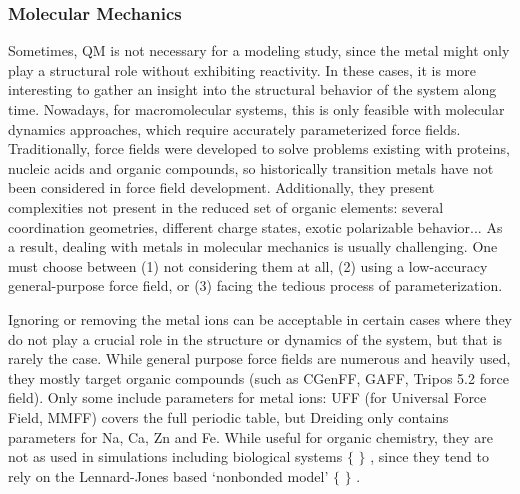 \subsubsection{Molecular Mechanics}
Sometimes, QM is not necessary for a modeling study, since the metal might only play a structural role without exhibiting reactivity. In these cases, it is more interesting to gather an insight into the structural behavior of the system along time. Nowadays, for macromolecular systems, this is only feasible with molecular dynamics approaches, which require accurately parameterized force fields. Traditionally, force fields were developed to solve problems existing with proteins, nucleic acids and organic compounds,\cite{lifson1968consistent,allinger1973,momany1975energy} so historically transition metals have not been considered in force field development. Additionally, they present complexities not present in the reduced set of organic elements: several coordination geometries, different charge states, exotic polarizable behavior... As a result, dealing with metals in molecular mechanics is usually challenging. One must choose between (1) not considering them at all, (2) using a low-accuracy general-purpose force field, or (3) facing the tedious process of parameterization.

Ignoring or removing the metal ions can be acceptable in certain cases where they do not play a crucial role in the structure or dynamics of the system, but that is rarely the case. While general purpose force fields are numerous and heavily used, they mostly target organic compounds (such as CGenFF,\cite{Vanommeslaeghe2009} GAFF,\cite{Wang2004} Tripos 5.2 force field\cite{clark1989}). Only some include parameters for metal ions: UFF (for Universal Force Field,\cite{rappe1992} MMFF\cite{halgren1996}) covers the full periodic table, but Dreiding\cite{Mayo1990} only contains parameters for Na, Ca, Zn and Fe. While useful for organic chemistry, they are not as used in simulations including biological systems $ \{ $ $ \} $ , since they tend to rely on the Lennard-Jones based ‘nonbonded model’ $ \{ $ $ \} $ .

